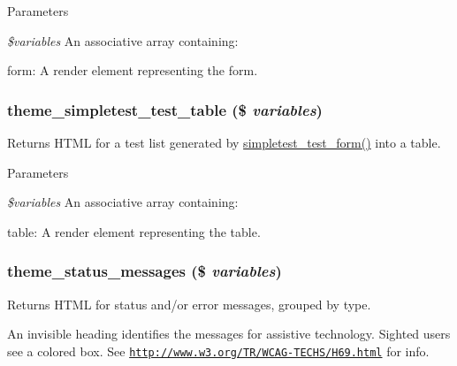 \begin{DoxyParams}{Parameters}
\item[{\em \$variables}]An associative array containing:
\begin{DoxyItemize}
\item form: A render element representing the form. 
\end{DoxyItemize}\end{DoxyParams}
\hypertarget{group__themeable_gaed0609b7e410d8c7d4588da68d7a6db9}{
\subsubsection[{theme\_\-simpletest\_\-test\_\-table}]{\setlength{\rightskip}{0pt plus 5cm}theme\_\-simpletest\_\-test\_\-table (\$ {\em variables})}}
\label{group__themeable_gaed0609b7e410d8c7d4588da68d7a6db9}
Returns HTML for a test list generated by \hyperlink{simpletest_8pages_8inc_a4118469154c4614c80157667a553ec23}{simpletest\_\-test\_\-form()} into a table.


\begin{DoxyParams}{Parameters}
\item[{\em \$variables}]An associative array containing:
\begin{DoxyItemize}
\item table: A render element representing the table. 
\end{DoxyItemize}\end{DoxyParams}
\hypertarget{group__themeable_gad29a18ad4d19a5fc0a3c75a8804f0331}{
\subsubsection[{theme\_\-status\_\-messages}]{\setlength{\rightskip}{0pt plus 5cm}theme\_\-status\_\-messages (\$ {\em variables})}}
\label{group__themeable_gad29a18ad4d19a5fc0a3c75a8804f0331}
Returns HTML for status and/or error messages, grouped by type.

An invisible heading identifies the messages for assistive technology. Sighted users see a colored box. See \href{http://www.w3.org/TR/WCAG-TECHS/H69.html}{\tt http://www.w3.org/TR/WCAG-\/TECHS/H69.html} for info.


